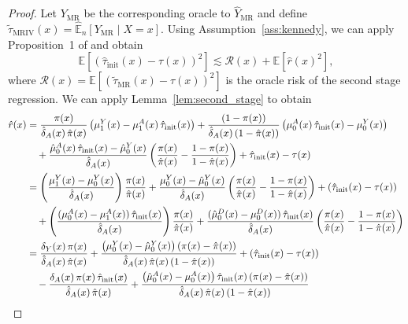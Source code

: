 \documentclass{article} %
\newcommand{\E}{\mathbb{E}}
\theoremstyle{definition}
\theoremstyle{plain}
\begin{document}
\begin{proof}%
Let $Y_{\mathrm{\mathrm{MR}}}$ be the corresponding oracle to $\hat{Y}_{\mathrm{\mathrm{MR}}}$ and define $\widetilde{\tau}_{\mathrm{MRIV}}(x) = \hat{\E}_n[Y_{\mathrm{\mathrm{MR}}} \mid X = x]$.
Using Assumption~\ref{ass:kennedy}, we can apply Proposition~1 of \citet{Kennedy.2022d} and obtain
\begin{equation}
    \E\left[\left(\hat{\tau}_{\mathrm{init}}(x) - \tau(x)\right)^2\right] \lesssim  \mathcal{R}(x) + \E\left[\hat{r}(x)^2 \right],
\end{equation}
where $\mathcal{R}(x) = \E\left[\left(\widetilde{\tau}_{\mathrm{\mathrm{MR}}}(x) - \tau(x)\right)^2\right]$ is the oracle risk of the second stage regression.
We can apply Lemma~\ref{lem:second_stage} to obtain
\begin{align}
   \hat{r}(x) &=  \frac{\pi(x)}{\hat{\delta}_A(x) \, \hat{\pi}(x)} \left(\mu_1^Y(x) - \mu_1^A(x) \, \hat{\tau}_{\mathrm{init}}(x)\right)
   + \frac{(1-\pi(x))}{\hat{\delta}_A(x) \, (1 - \hat{\pi}(x))} \left(\mu_0^A(x) \, \hat{\tau}_{\mathrm{init}}(x) -\mu_0^Y(x) \right) \notag \\ & \quad + 
   \frac{\hat{\mu}_0^A(x) \, \hat{\tau}_{\mathrm{init}}(x) - \hat{\mu}_0^Y (x)}{\hat{\delta}_A(x)} \left(\frac{\pi(x)}{\hat{\pi}(x)} - \frac{1- \pi(x)}{1-\hat{\pi}(x)} \right) + \hat{\tau}_{\mathrm{init}}(x) - \tau(x) \\
   &= \left(\frac{\mu_1^Y(x) - \mu_0^Y(x)}{\hat{\delta}_A(x)} \right) \frac{\pi(x)}{\hat{\pi}(x)} + \frac{\mu_0^Y(x) - \hat{\mu}_0^Y(x)}{\hat{\delta}_A(x)} \left(  \frac{\pi(x)}{\hat{\pi}(x)} -  \frac{1 - \pi(x)}{1 - \hat{\pi}(x)} \right)  + \left(\hat{\tau}_{\mathrm{init}}(x) - \tau(x)\right) \notag \\
   & \quad + \left( \frac{(\mu_0^A(x) - \mu_1^A(x)) \, \hat{\tau}_{\mathrm{init}}(x)}{\hat{\delta}_A(x)} \right) \frac{\pi(x)}{\hat{\pi}(x)} + \frac{(\hat{\mu}_0^D(x) - \mu_0^D(x)) \, \hat{\tau}_{\mathrm{init}}(x)}{\hat{\delta}_A(x)} \left(  \frac{\pi(x)}{\hat{\pi}(x)} -  \frac{1 - \pi(x)}{1 - \hat{\pi}(x)} \right) \\
   &= \frac{\delta_Y(x) \, \pi(x)}{\hat{\delta}_A(x) \, \hat{\pi}(x)} + \frac{\left(\mu_0^Y(x) - \hat{\mu}_0^Y(x)\right) \left(\pi(x) - \hat{\pi}(x)\right)}{\hat{\delta}_A(x) \, \hat{\pi}(x) \left(1 - \hat{\pi}(x) \right)} + \left(\hat{\tau}_{\mathrm{init}}(x) - \tau(x)\right) \notag \\
   & \quad - \frac{\delta_A(x) \, \pi(x) \, \hat{\tau}_{\mathrm{init}}(x)}{\hat{\delta}_A(x) \, \hat{\pi}(x)} + \frac{\left(\hat{\mu}_0^A(x) - \mu_0^A(x)\right) \hat{\tau}_{\mathrm{init}}(x) \left(\pi(x) - \hat{\pi}(x) \right)}{\hat{\delta}_A(x) \, \hat{\pi}(x) \left(1 - \hat{\pi}(x)\right)} \\

\end{align}
\end{proof}
\end{document}
